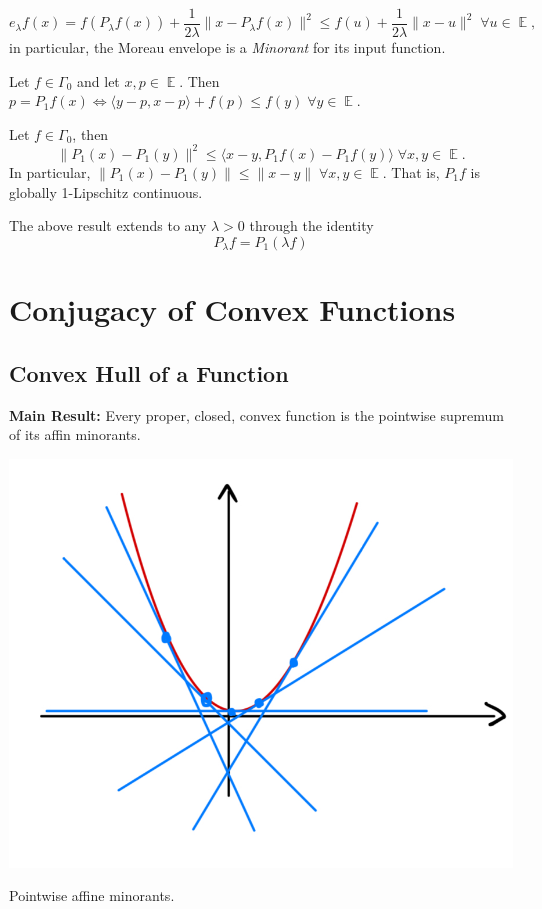 \documentclass{tufte-handout}
\DeclareMathOperator{\E}{\mathbb{E}}
\begin{document}
{\begin{remark}
    $$e_\lambda f(x) = f(P_\lambda f(x)) + \frac{1}{2\lambda} \|x- P_\lambda f(x)\|^2 \leq f(u) + \frac{1}{2\lambda} \| x-u \|^2 \; \forall u \in \E, $$
    in particular, the Moreau envelope is a \textit{Minorant} for its input function.
  \end{remark}
  \begin{proposition} 
    Let $f \in \Gamma_0$ and let $x,p \in \E$. Then $p = P_1f(x) \iff \langle y -p , x-p \rangle + f(p) \leq f(y) \; \forall y \in \E.$ 
  \end{proposition}
  \begin{proposition}
    Let $f \in \Gamma_0$, then $$\| P_1(x) - P_1 (y) \|^2 \leq \langle x-y , P_1f(x) - P_1 f(y) \rangle \; \forall x,y \in \E.$$ In particular, $\| P_1 (x) - P_1 (y) \| \leq \| x-y\| \; \forall x,y \in \E.$ That is, $P_1f$ is globally 1-Lipschitz continuous.
  \end{proposition}
  \begin{remark} 
    The above result extends to any $\lambda > 0$ through the identity 
    $$P_\lambda f = P_1 (\lambda f) $$
  \end{remark}
\section{Conjugacy of Convex Functions}%
  \label{sec:Conjugacy of Convex Functions}
  \subsection{Convex Hull of a Function}%
    \label{sub:Convex Hull of a Function}
    \textbf{Main Result:} Every proper, closed, convex function is the pointwise supremum of its affin minorants.
    \begin{theorem}
       \begin{marginfigure}
  \includegraphics{AffineMinorant}
  \caption{Pointwise affine minorants.}
\end{marginfigure}


\end{theorem}}
\end{document}
